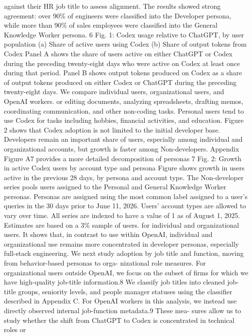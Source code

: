 against their HR job title to assess alignment. The results showed strong agreement: over 90\% of engineers were classified into
the Developer persona, while more than 90\% of sales employees were classified into the General Knowledge Worker persona.
6
Fig. 1: Codex usage relative to ChatGPT, by user population
(a) Share of active users using Codex
(b) Share of output tokens from Codex
Panel A shows the share of users active on either ChatGPT or Codex during the preceding twenty-eight days who were active
on Codex at least once during that period. Panel B shows output tokens produced on Codex as a share of output tokens
produced on either Codex or ChatGPT during the preceding twenty-eight days. We compare individual users, organizational
users, and OpenAI workers.
or editing documents, analyzing spreadsheets, drafting memos, coordinating communication, and other
non-coding tasks. Personal users tend to use Codex for tasks including hobbies, financial activities, and
education.
Figure 2 shows that Codex adoption is not limited to the initial developer base. Developers remain
an important share of users, especially among individual and organizational accounts, but growth is
faster among Non-developers. Appendix Figure A7 provides a more detailed decomposition of personas
7
Fig. 2: Growth in active Codex users by account type and persona
Figure shows growth in users active in the previous 28 days, by persona and account type. The Non-developer series pools
users assigned to the Personal and General Knowledge Worker personas. Personas are assigned using the most common label
assigned to a user’s queries in the 30 days prior to June 11, 2026. Users’ account types are allowed to vary over time. All series
are indexed to have a value of 1 as of August 1, 2025. Estimates are based on a 3\% sample of users.
for individual and organizational users. It shows that, in contrast to use within OpenAI, individual and
organizational use remains more concentrated in developer personas, especially full-stack engineering.
We next study adoption by job title and function, moving from behavior-based personas to orga-
nizational role measures. For organizational users outside OpenAI, we focus on the subset of firms for
which we have high-quality job-title information.8 We classify job titles into cleaned job-title groups,
seniority levels, and people manager statuses using the classifier described in Appendix C. For OpenAI
workers in this analysis, we instead use directly observed internal job-function metadata.9 These mea-
sures allow us to study whether the shift from ChatGPT to Codex is concentrated in technical roles or
